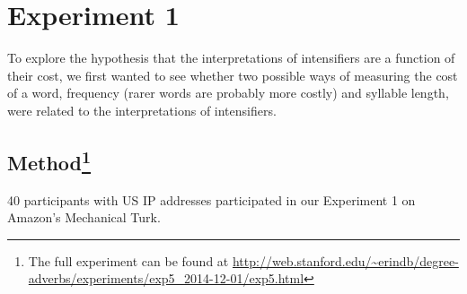 \documentclass[10pt,letterpaper]{article}
\begin{document}

\section{Experiment 1}

To explore the hypothesis that the interpretations of intensifiers are a function of their cost, we first wanted to see whether two possible ways of measuring the cost of a word, frequency (rarer words are probably more costly) and syllable length, were related to the interpretations of intensifiers.

\subsection{Method\footnote{The full experiment can be found at \url{http://web.stanford.edu/~erindb/degree-adverbs/experiments/exp5_2014-12-01/exp5.html}}}

40 participants with US IP addresses participated in our Experiment 1 on Amazon's Mechanical Turk.
\end{document}
